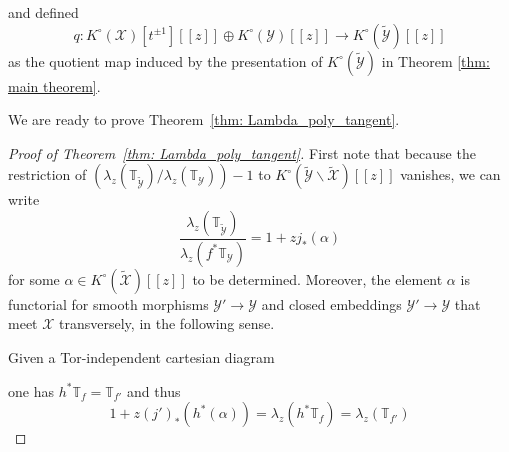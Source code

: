 \documentclass[12pt]{amsart}
\newcommand{\bT}{\mathbb{T}}
\newcommand{\cX}{\mathcal{X}}
\newcommand{\cY}{\mathcal{Y}}
\newcommand{\Kring}{K^{\circ}}
\theoremstyle{definition}
\begin{document}
and defined
$$
q: \Kring(\cX)[t^{\pm 1} ] [\![ z ]\!] \oplus \Kring(\cY)[\![ z ]\!] \longrightarrow \Kring(\widetilde{\cY})[\![ z ]\!]
$$
as the quotient map induced by the presentation of $\Kring(\widetilde{\cY})$ in Theorem \ref{thm: main theorem}.

We are ready to prove Theorem~\ref{thm: Lambda_poly_tangent}.

\begin{proof}[Proof of Theorem~\ref{thm: Lambda_poly_tangent}]
    
First note that because the restriction of $(\lambda_z(\bT_{\widetilde{\cY}})/\lambda_z(\bT_{\cY}))-1$ to $\Kring(\widetilde{\cY} \smallsetminus \widetilde{\cX})[\![ z ]\!]$
vanishes, we can write 
\begin{equation}\label{eqn: def_alpha}
\frac{\lambda_z(\bT_{\widetilde{\cY}})}{\lambda_z(f^* \bT_{\cY})} =1+ z j_*(\alpha)
\end{equation}
for some $\alpha \in \Kring(\widetilde{\cX})[\![ z ]\!]$ to be determined. Moreover, the element $\alpha$ is functorial for smooth morphisms $\cY' \to \cY$ and closed embeddings $\cY' \to \cY$ that meet $\cX$ transversely, in the following sense. 

Given a Tor-independent cartesian diagram 
\begin{center}
\end{center}
one has $h^* \bT_{f}=\bT_{f'}$ and thus
\begin{equation*}
1+z (j')_*(h^*(\alpha))=\lambda_z(h^* \bT_{f})= \lambda_z(\bT_{f'})
\end{equation*}


\end{proof}
\end{document}
